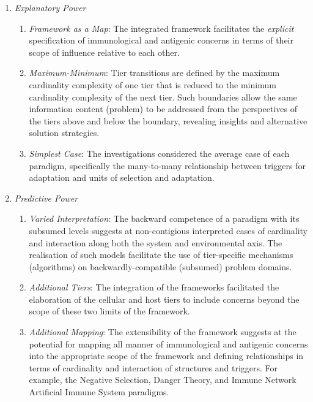 \begin{enumerate}
	\item \emph{Explanatory Power}
	\begin{enumerate}
		\item \emph{Framework as a Map}: The integrated framework facilitates the \emph{explicit} specification of immunological and antigenic concerns in terms of their scope of influence relative to each other. 
		\item \emph{Maximum-Minimum}: Tier transitions are defined by the maximum cardinality complexity of one tier that is reduced to the minimum cardinality complexity of the next tier. Such boundaries allow the same information content (problem) to be addressed from the perspectives of the tiers above and below the boundary, revealing insights and alternative solution strategies.		
		\item \emph{Simplest Case}: The investigations considered the average case of each paradigm, specifically the many-to-many relationship between triggers for adaptation and units of selection and adaptation.
	\end{enumerate}
	
	\item \emph{Predictive Power}
	\begin{enumerate}
		\item \emph{Varied Interpretation}: The backward competence of a paradigm with its subsumed levels suggests at non-contigious interpreted cases of cardinality and interaction along both the system and environmental axis. The realisation of such models facilitate the use of tier-specific mechanisms (algorithms) on backwardly-compatible (subsumed) problem domains. 
		\item \emph{Additional Tiers}: The integration of the frameworks facilitated the elaboration of the cellular and host tiers to include concerns beyond the scope of these two limits of the framework.
		\item \emph{Additional Mapping}: The extensibility of the framework suggests at the potential for mapping all manner of immunological and antigenic concerns into the appropriate scope of the framework and defining relationships in terms of cardinality and interaction of structures and triggers. For example, the Negative Selection, Danger Theory, and Immune Network Artificial Immune System paradigms.
	\end{enumerate}		
\end{enumerate}


